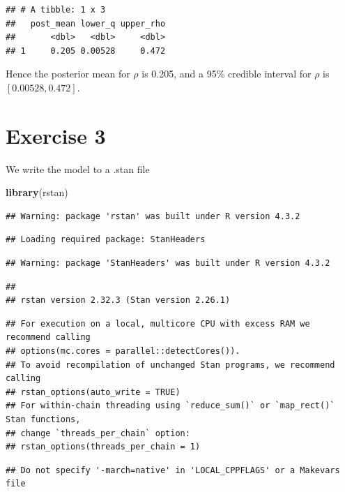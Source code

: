\documentclass[
]{article}
\newenvironment{Shaded}{\begin{snugshade}}{\end{snugshade}}
\newcommand{\FunctionTok}[1]{\textcolor[rgb]{0.13,0.29,0.53}{\textbf{#1}}}
\newcommand{\NormalTok}[1]{#1}
\begin{document}
\begin{verbatim}
## # A tibble: 1 x 3
##   post_mean lower_q upper_rho
##       <dbl>   <dbl>     <dbl>
## 1     0.205 0.00528     0.472
\end{verbatim}

Hence the posterior mean for \(\rho\) is 0.205, and a 95\% credible
interval for \(\rho\) is \([0.00528,0.472]\).

\hypertarget{exercise-3}{%
\section{Exercise 3}\label{exercise-3}}

We write the model to a .stan file

\begin{Shaded}
\begin{Highlighting}[]
\FunctionTok{library}\NormalTok{(rstan)}
\end{Highlighting}
\end{Shaded}

\begin{verbatim}
## Warning: package 'rstan' was built under R version 4.3.2
\end{verbatim}

\begin{verbatim}
## Loading required package: StanHeaders
\end{verbatim}

\begin{verbatim}
## Warning: package 'StanHeaders' was built under R version 4.3.2
\end{verbatim}

\begin{verbatim}
## 
## rstan version 2.32.3 (Stan version 2.26.1)
\end{verbatim}

\begin{verbatim}
## For execution on a local, multicore CPU with excess RAM we recommend calling
## options(mc.cores = parallel::detectCores()).
## To avoid recompilation of unchanged Stan programs, we recommend calling
## rstan_options(auto_write = TRUE)
## For within-chain threading using `reduce_sum()` or `map_rect()` Stan functions,
## change `threads_per_chain` option:
## rstan_options(threads_per_chain = 1)
\end{verbatim}

\begin{verbatim}
## Do not specify '-march=native' in 'LOCAL_CPPFLAGS' or a Makevars file
\end{verbatim}
\end{document}
